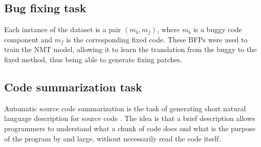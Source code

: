 \subsection{Bug fixing task}
Each instance of the dataset is a pair $(m_b, m_f)$, where $m_b$ is a buggy code component and $m_f$ is the
corresponding fixed code. These BFPs were used to train the NMT model, allowing it to learn the translation
from the buggy to the fixed method, thus being able to generate fixing patches.
\subsection{Code summarization task}
Automatic source code summarization is the task of generating short natural language description 
for source code \cite{Leclair2020}. The idea is that a brief description allows programmers to understand
what a chunk of code does and what is the purpose of the program by and large, without necessarily read the code 
itself.\\
